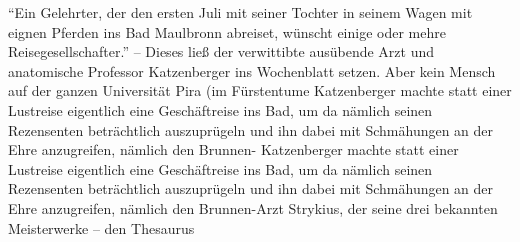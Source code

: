 \documentclass[11pt]{book}
\begin{document}
\beginnumbering
\pstart
``Ein Gelehrter, der den ersten Juli mit seiner Tochter in seinem Wagen mit eignen Pferden ins Bad Maulbronn abreiset, wünscht einige oder mehre Reisegesellschafter.'' -- Dieses ließ der verwittibte ausübende Arzt und anatomische Professor Katzenberger ins Wochenblatt setzen. Aber kein Mensch auf der ganzen Universität Pira (im Fürstentume
\pend
\pstart
Katzenberger machte statt einer Lustreise eigentlich eine Geschäftreise ins Bad, um da nämlich seinen Rezensenten beträchtlich auszuprügeln und ihn dabei mit Schmähungen an der Ehre anzugreifen, nämlich den Brunnen-\pend
\pstart
Katzenberger machte statt einer Lustreise eigentlich eine Geschäftreise ins Bad, um da nämlich seinen Rezensenten beträchtlich auszuprügeln und ihn dabei mit Schmähungen an der Ehre anzugreifen, nämlich den Brunnen-Arzt Strykius, der seine drei bekannten Meisterwerke -- den Thesaurus \pend
\endnumbering
\end{document}
